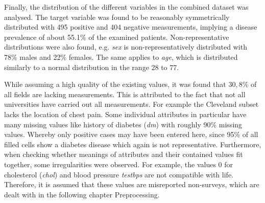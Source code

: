 Finally, the distribution of the different variables in the combined dataset was analysed. The target variable was found to be reasonably symmetrically distributed with 495 positive and 404 negative measurements, implying a disease prevalence of about 55.1\% of the examined patients. Non-representative distributions were also found, e.g. \textit{sex} is non-representatively distributed with 78\% males and 22\% females. The same applies to \textit{age}, which is distributed similarly to a normal distribution in the range 28 to 77.

While assuming a high quality of the existing values, it was found that $30,8\%$ of all fields are lacking measurements. This is attributed to the fact that not all universities have carried out all measurements. For example the Cleveland subset lacks the location of chest pain. Some individual attributes in particular have many missing values like history of diabetes (\textit{dm}) with roughly 90\% missing values. Whereby only positive cases may have been entered here, since 95\% of all filled cells show a diabetes disease which again is not representative. Furthermore, when checking whether meanings of attributes and their contained values fit together, some irregularities were observed. For example, the values 0 for cholesterol (\textit{chol}) and blood pressure \textit{testbps} are not compatible with life. Therefore, it is assumed that these values are misreported non-surveys, which are dealt with in the following chapter Preprocessing.
